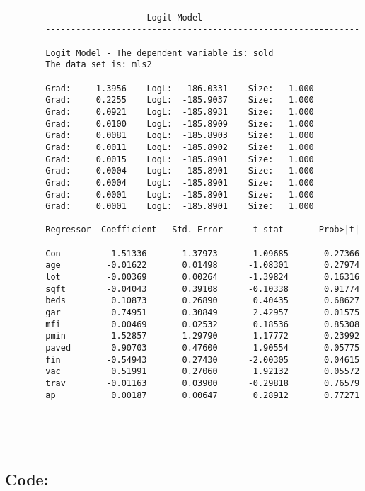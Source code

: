 \documentclass[12pt]{article}
\begin{document}
\begin{verbatim}
		--------------------------------------------------------------
							Logit Model 
		--------------------------------------------------------------
		
		Logit Model - The dependent variable is: sold
		The data set is: mls2
		
		Grad:     1.3956    LogL:  -186.0331    Size:   1.000
		Grad:     0.2255    LogL:  -185.9037    Size:   1.000
		Grad:     0.0921    LogL:  -185.8931    Size:   1.000
		Grad:     0.0100    LogL:  -185.8909    Size:   1.000
		Grad:     0.0081    LogL:  -185.8903    Size:   1.000
		Grad:     0.0011    LogL:  -185.8902    Size:   1.000
		Grad:     0.0015    LogL:  -185.8901    Size:   1.000
		Grad:     0.0004    LogL:  -185.8901    Size:   1.000
		Grad:     0.0004    LogL:  -185.8901    Size:   1.000
		Grad:     0.0001    LogL:  -185.8901    Size:   1.000
		Grad:     0.0001    LogL:  -185.8901    Size:   1.000
		
		Regressor  Coefficient	 Std. Error 	 t-stat       Prob>|t|
		--------------------------------------------------------------
		Con         -1.51336       1.37973      -1.09685       0.27366 
		age         -0.01622       0.01498      -1.08301       0.27974 
		lot         -0.00369       0.00264      -1.39824       0.16316 
		sqft        -0.04043       0.39108      -0.10338       0.91774 
		beds         0.10873       0.26890       0.40435       0.68627 
		gar          0.74951       0.30849       2.42957       0.01575 
		mfi          0.00469       0.02532       0.18536       0.85308 
		pmin         1.52857       1.29790       1.17772       0.23992 
		paved        0.90703       0.47600       1.90554       0.05775 
		fin         -0.54943       0.27430      -2.00305       0.04615 
		vac          0.51991       0.27060       1.92132       0.05572 
		trav        -0.01163       0.03900      -0.29818       0.76579 
		ap           0.00187       0.00647       0.28912       0.77271 
		
		--------------------------------------------------------------
		--------------------------------------------------------------
			
	\end{verbatim}
	\subsection*{Code:}
	
	
		
			
\end{document}
